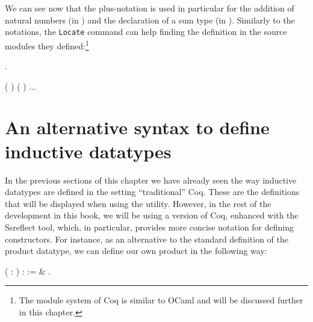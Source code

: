 We can see now that the plus-notation is used in particular for the
addition of natural numbers (in ) and the declaration of a
sum type (in ). Similarly to the notations, the
\texttt{Locate} command can help finding the definition in the
source modules they defined:\footnote{The module system of Coq is
similar to OCaml and will be discussed further in this chapter.} \begin{coqdoccode}
\coqdocemptyline
\coqdocnoindent
{} .\coqdoceol
\coqdocemptyline
\end{coqdoccode}
\coqdoceol
\coqdocemptyline
\coqdocnoindent
{} \coqdoceol
\coqdocindent{1.00em}
(          )\coqdoceol
\coqdocnoindent
{} \coqdoceol
\coqdocindent{1.00em}
(          )\coqdoceol
\coqdocnoindent
...

\coqdocemptyline


\section{An alternative syntax to define inductive datatypes}




In the previous sections of this chapter we have already seen the way
inductive datatypes are defined in the setting ``traditional''
Coq. These are the definitions that will be displayed when using the
 utility. However, in the rest of the development in this book,
we will be using a version of Coq, enhanced with the Ssreflect tool,
which, in particular, provides more concise notation for defining
constructors. For instance, as an alternative to the standard
definition of the product datatype, we can define our own product in
the following way:


\begin{coqdoccode}
\coqdocemptyline
\coqdocnoindent
{}  (  : ) :  :=     \& .\coqdoceol
\coqdocemptyline
\end{coqdoccode}


